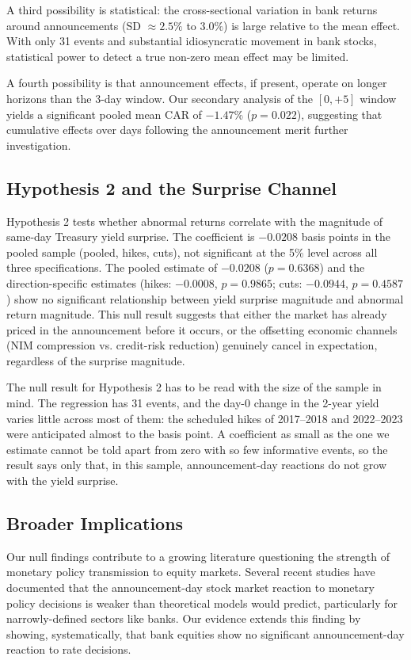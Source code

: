 \documentclass[11pt]{article}
\begin{document}
A third possibility is statistical: the cross-sectional variation in bank returns around announcements (SD $\approx 2.5\%$ to $3.0\%$) is large relative to the mean effect. With only 31 events and substantial idiosyncratic movement in bank stocks, statistical power to detect a true non-zero mean effect may be limited.

A fourth possibility is that announcement effects, if present, operate on longer horizons than the 3-day window. Our secondary analysis of the $[0, +5]$ window yields a significant pooled mean CAR of $-1.47\%$ ($p = 0.022$), suggesting that cumulative effects over days following the announcement merit further investigation.

\subsection{Hypothesis 2 and the Surprise Channel}\label{sec:h2_interpretation}

Hypothesis 2 tests whether abnormal returns correlate with the magnitude of same-day Treasury yield surprise. The coefficient is $-0.0208$ basis points in the pooled sample (pooled, hikes, cuts), not significant at the 5\% level across all three specifications. The pooled estimate of $-0.0208$ ($p = 0.6368$) and the direction-specific estimates (hikes: $-0.0008$, $p = 0.9865$; cuts: $-0.0944$, $p = 0.4587$) show no significant relationship between yield surprise magnitude and abnormal return magnitude. This null result suggests that either the market has already priced in the announcement before it occurs, or the offsetting economic channels (NIM compression vs. credit-risk reduction) genuinely cancel in expectation, regardless of the surprise magnitude.

The null result for Hypothesis 2 has to be read with the size of the sample in mind. The regression has 31 events, and the day-0 change in the 2-year yield varies little across most of them: the scheduled hikes of 2017--2018 and 2022--2023 were anticipated almost to the basis point. A coefficient as small as the one we estimate cannot be told apart from zero with so few informative events, so the result says only that, in this sample, announcement-day reactions do not grow with the yield surprise.

\subsection{Broader Implications}

Our null findings contribute to a growing literature questioning the strength of monetary policy transmission to equity markets. Several recent studies have documented that the announcement-day stock market reaction to monetary policy decisions is weaker than theoretical models would predict, particularly for narrowly-defined sectors like banks. Our evidence extends this finding by showing, systematically, that bank equities show no significant announcement-day reaction to rate decisions.
\end{document}
